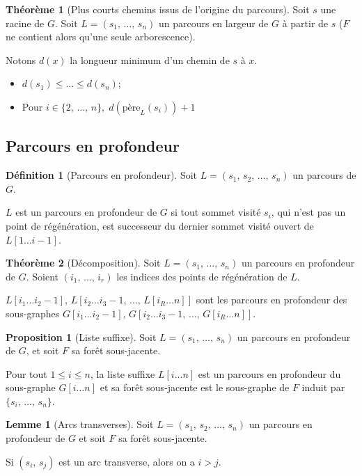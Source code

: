 \documentclass[11pt,english,french]{scrreprt}
\theoremstyle{remark}
\theoremstyle{definition}
\newtheorem*{def*}{Définition}
\newtheorem*{prop*}{Proposition}
\newtheorem*{lem*}{Lemme}
\newtheorem*{thm*}{Théorème}
\begin{document}
\begin{thm*}[Plus courts chemins issus de l'origine du parcours]
	Soit $s$ une racine de $G$. Soit $L=(s_1,\,\dots,\,s_n)$ un parcours en largeur de $G$ à partir de $s$ ($F$ ne contient alors qu'une seule arborescence).
	
	Notons $d(x)$ la longueur minimum d'un chemin de $s$ à $x$.
	\begin{itemize}
		\item $d(s_1)\leqslant\dots\leqslant d(s_n)$;
		\item Pour $i\in\{2,\,\dots,\,n\},\;d(\textrm{père}_L(s_i))+1$
	\end{itemize}
\end{thm*}

\subsection{Parcours en profondeur} %

\begin{def*}[Parcours en profondeur]
	Soit $L=(s_1,\,s_2,\,\dots,\,s_n)$ un parcours de $G$.
	
	$L$ est un parcours en profondeur de $G$ si tout sommet visité $s_i$, qui n'est pas un point de régénération, est successeur du dernier sommet visité ouvert de $L[1\dots i-1]$.
\end{def*}

\begin{thm*}[Décomposition]
	Soit $L=(s_1,\,\dots,\,s_n)$ un parcours en profondeur de $G$. Soient $(i_1,\,\dots,\,i_r)$ les indices des points de régénération de $L$.
	
	$L[i_1\dots i_2-1],\,L[i_2\dots i_3-1,\,\dots,\,L[i_R\dots n]]$ sont les parcours en profondeur des sous-graphes 	$G[i_1\dots i_2-1],\,G[i_2\dots i_3-1,\,\dots,\,G[i_R\dots n]]$.
\end{thm*}

\begin{prop*}[Liste suffixe]
	Soit $L=(s_1,\,\dots,\,s_n)$ un parcours en profondeur de $G$, et soit $F$ sa forêt sous-jacente.
	
	Pour tout $1\leqslant i\leqslant n$, la liste suffixe $L[i\dots n]$ est un parcours en profondeur du sous-graphe $G[i\dots n]$ et sa forêt sous-jacente est le sous-graphe de $F$ induit par $\{s_i,\,\dots,\,s_n\}$.
\end{prop*}

\begin{lem*}[Arcs transverses]
	Soit $L=(s_1,\,s_2,\,\dots,\,s_n)$ un parcours en profondeur de $G$ et soit $F$ sa forêt sous-jacente.
	
	Si $(s_i,\,s_j)$ est un arc transverse, alors on a $i>j$.
\end{lem*}
\end{document}
